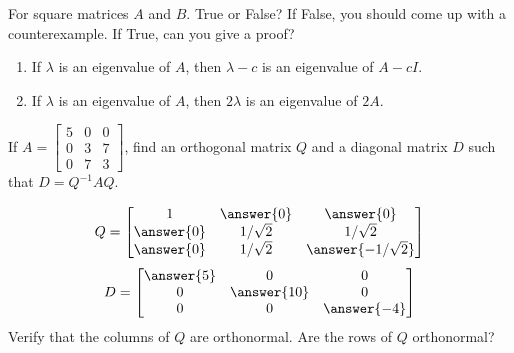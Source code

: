 \documentclass{ximera}
\begin{document}
\begin{exercise}

For square matrices $A$ and $B$.  True or False?  If False, you should come up with a counterexample.  If True, can you give a proof?

 \begin{enumerate}
 
 \item If $\lambda$ is an eigenvalue of $A$, then $\lambda - c$ is an eigenvalue of $A - cI$.
 \begin{multipleChoice}
 \end{multipleChoice}

 \item If $\lambda$ is an eigenvalue of $A$, then $2\lambda$ is an eigenvalue of $2A$.
 \begin{multipleChoice}
 \end{multipleChoice}

 \end{enumerate}
\end{exercise}

\begin{exercise}
If $A = \begin{bmatrix}
5 & 0 & 0 \\
0 & 3 & 7 \\
0 & 7 & 3
\end{bmatrix}$, find an orthogonal matrix $Q$ and a diagonal matrix $D$ such that $D=Q^{-1}AQ$.

$$Q = \begin{bmatrix}
1 & \answer{0} & \answer{0} \\
\answer{0} & 1/\sqrt{2} & 1/\sqrt{2} \\
\answer{0} & 1/\sqrt{2} & \answer{-1/\sqrt{2}}
\end{bmatrix}$$
$$D=\begin{bmatrix}\answer{5} & 0 &0\\0&\answer{10} & 0\\0 & 0 &\answer{-4}\end{bmatrix}$$
Verify that the columns of $Q$ are orthonormal.  Are the rows of $Q$ orthonormal?

 \end{exercise}
\end{document}
